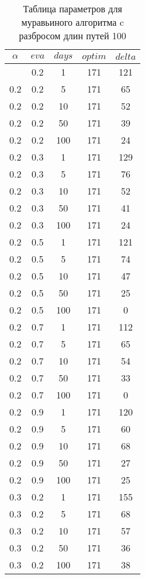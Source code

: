 \begin{appendices}
\begin{longtable}{|c|c|c|c|c|}
	\end{longtable}
	\begin{longtable}{|c|c|c|c|c|}
		\caption{Таблица параметров для муравьиного алгоритма c разбросом длин путей 100}\label{t:params_2}\\
		\hline
		$\alpha$ & $eva$ & $days$ & $optim$ & $delta$ \\ \hline
		\endhead
		\endfoot
		0.2 & 0.2 & 1   & 171 & 121 \\
		0.2 & 0.2 & 5   & 171 & 65  \\
		0.2 & 0.2 & 10  & 171 & 52  \\
		0.2 & 0.2 & 50  & 171 & 39  \\
		0.2 & 0.2 & 100 & 171 & 24  \\ \hline
		0.2 & 0.3 & 1   & 171 & 129 \\
		0.2 & 0.3 & 5   & 171 & 76  \\
		0.2 & 0.3 & 10  & 171 & 52  \\
		0.2 & 0.3 & 50  & 171 & 41  \\
		0.2 & 0.3 & 100 & 171 & 24  \\ \hline
		0.2 & 0.5 & 1   & 171 & 121 \\
		0.2 & 0.5 & 5   & 171 & 74  \\
		0.2 & 0.5 & 10  & 171 & 47  \\
		0.2 & 0.5 & 50  & 171 & 25  \\
		0.2 & 0.5 & 100 & 171 & 0   \\ \hline
		0.2 & 0.7 & 1   & 171 & 112 \\
		0.2 & 0.7 & 5   & 171 & 65  \\
		0.2 & 0.7 & 10  & 171 & 54  \\
		0.2 & 0.7 & 50  & 171 & 33  \\
		0.2 & 0.7 & 100 & 171 & 0   \\ \hline
		0.2 & 0.9 & 1   & 171 & 120 \\
		0.2 & 0.9 & 5   & 171 & 60  \\
		0.2 & 0.9 & 10  & 171 & 68  \\
		0.2 & 0.9 & 50  & 171 & 27  \\
		0.2 & 0.9 & 100 & 171 & 25  \\ \hline
		0.3 & 0.2 & 1   & 171 & 155 \\
		0.3 & 0.2 & 5   & 171 & 68  \\
		0.3 & 0.2 & 10  & 171 & 57  \\
		0.3 & 0.2 & 50  & 171 & 36  \\
		0.3 & 0.2 & 100 & 171 & 38  \\ \hline

\end{longtable}
\end{appendices}
